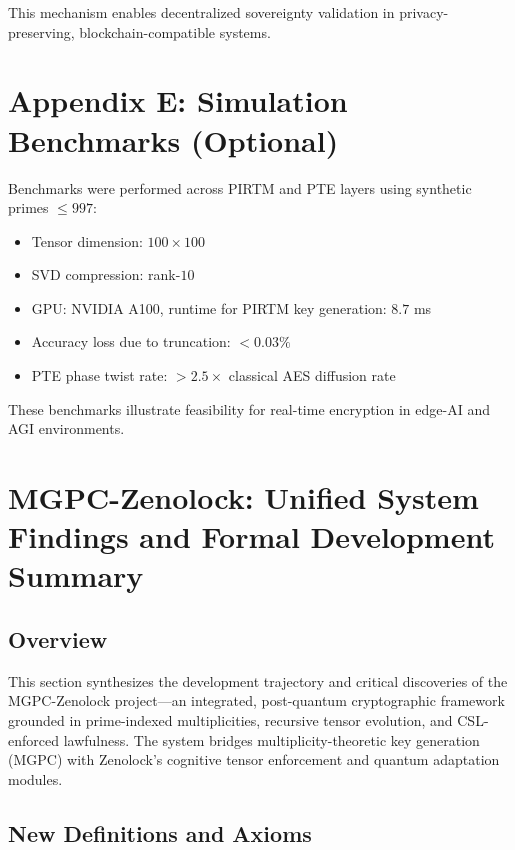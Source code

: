 \documentclass{article}
\theoremstyle{plain}
\begin{document}
This mechanism enables decentralized sovereignty validation in privacy-preserving, blockchain-compatible systems.

\section{Appendix E: Simulation Benchmarks (Optional)}

Benchmarks were performed across PIRTM and PTE layers using synthetic primes $\leq 997$:

\begin{itemize}
  \item Tensor dimension: $100 \times 100$
  \item SVD compression: rank-$10$
  \item GPU: NVIDIA A100, runtime for PIRTM key generation: $8.7$ ms
  \item Accuracy loss due to truncation: $< 0.03\%$
  \item PTE phase twist rate: $> 2.5 \times$ classical AES diffusion rate
\end{itemize}

These benchmarks illustrate feasibility for real-time encryption in edge-AI and AGI environments.
\section{MGPC-Zenolock: Unified System Findings and Formal Development Summary}

\subsection{Overview}

This section synthesizes the development trajectory and critical discoveries of the MGPC-Zenolock project—an integrated, post-quantum cryptographic framework grounded in prime-indexed multiplicities, recursive tensor evolution, and CSL-enforced lawfulness. The system bridges multiplicity-theoretic key generation (MGPC) with Zenolock's cognitive tensor enforcement and quantum adaptation modules.

\subsection{New Definitions and Axioms}
\end{document}
